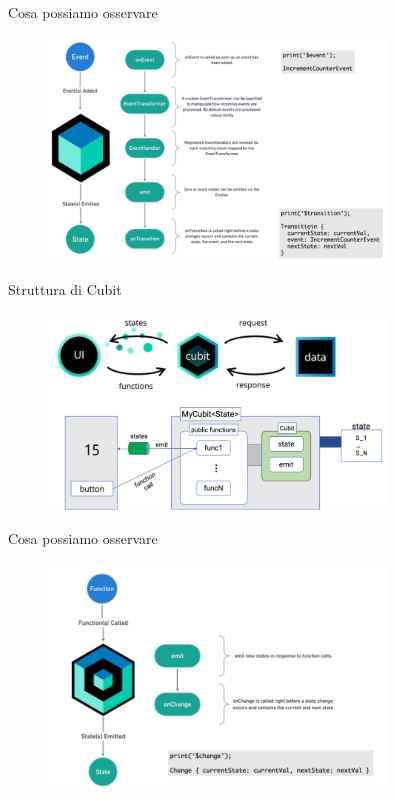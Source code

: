 \documentclass{../libs/presentation_format}
\begin{document}

\begin{frame}{Cosa possiamo osservare}
	\begin{figure}[htpb]
		\centering
		\includegraphics[width=9cm]{../libs/bloc-flow}
	\end{figure}
\end{frame}


\begin{frame}{Struttura di Cubit}
	\begin{figure}[htpb]
		\centering
		\includegraphics[width=9cm]{../libs/cubit-structure}
	\end{figure}
\end{frame}


\begin{frame}{Cosa possiamo osservare}
	\begin{figure}[htpb]
		\centering
		\includegraphics[width=9cm]{../libs/cubit-flow}
	\end{figure}
\end{frame}
\end{document}
